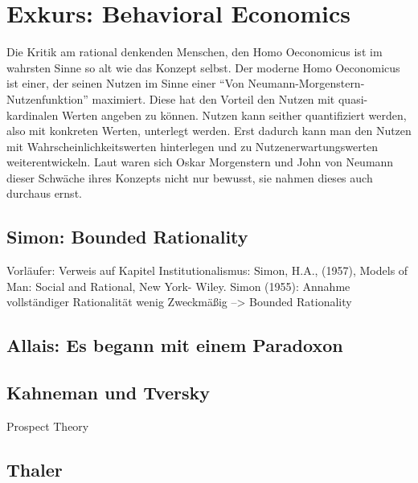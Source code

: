%
%
%

\chapter{Exkurs: Behavioral Economics}
\label{Behavioral}


Die Kritik am rational denkenden Menschen, den Homo Oeconomicus ist im wahrsten Sinne so alt wie das Konzept selbst. Der moderne Homo Oeconomicus ist einer, der seinen Nutzen im Sinne einer "`Von Neumann-Morgenstern-Nutzenfunktion"' \parencite{VonNeumann1944} maximiert. Diese hat den Vorteil den Nutzen mit quasi-kardinalen Werten angeben zu können. Nutzen kann seither quantifiziert werden, also mit konkreten Werten, unterlegt werden. Erst dadurch kann man den Nutzen mit Wahrscheinlichkeitswerten hinterlegen und zu Nutzenerwartungswerten weiterentwickeln. Laut \textcite[S. 3]{Selten2001} waren sich Oskar Morgenstern und John von Neumann dieser Schwäche ihres Konzepts nicht nur bewusst, sie nahmen dieses auch durchaus ernst.

\section{Simon: Bounded Rationality}
Vorläufer:
Verweis auf Kapitel Institutionalismus: Simon, H.A., (1957), Models of Man: Social and Rational, New York- Wiley.
Simon (1955): Annahme vollständiger Rationalität wenig Zweckmäßig --> Bounded Rationality
\textcite{Simon1959}


\section{Allais: Es begann mit einem Paradoxon}



\section{Kahneman und Tversky}
Prospect Theory

\section{Thaler}